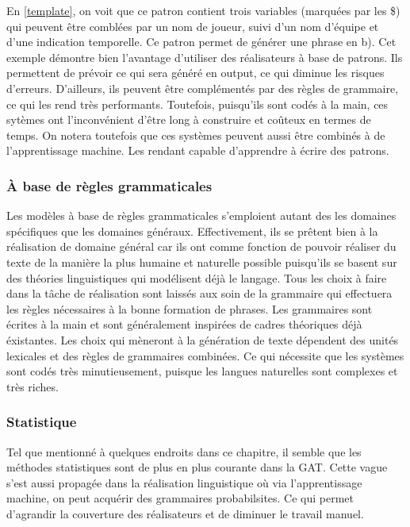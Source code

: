 En \ref{template}, on voit que ce patron contient trois variables (marquées par les \$) qui peuvent être comblées par un nom de joueur, suivi d'un nom d'équipe et d'une indication temporelle. Ce patron permet de générer une phrase en b). Cet exemple démontre bien l'avantage d'utiliser des réalisateurs à base de patrons. Ils permettent de prévoir ce qui sera généré en output, ce qui diminue les risques d'erreurs. D'ailleurs, ils peuvent être complémentés par des règles de grammaire, ce qui les rend très performants. Toutefois, puisqu'ils sont codés à la main, ces sytèmes ont l'inconvénient d'être long à construire et coûteux en termes de temps. On notera toutefois que ces systèmes peuvent aussi être combinés à de l'apprentissage machine. Les rendant capable d'apprendre à écrire des patrons.

\subsubsection{À base de règles grammaticales}
Les modèles à base de règles grammaticales s'emploient autant des les domaines spécifiques que les domaines généraux. Effectivement, ils se prêtent bien à la réalisation de domaine général car ils ont comme fonction de pouvoir réaliser du texte de la manière la plus humaine et naturelle possible puisqu'ils se basent sur des théories linguistiques qui modélisent déjà le langage. Tous les choix à faire dans la tâche de réalisation sont laissés aux soin de la grammaire qui effectuera les règles nécessaires à la bonne formation de phrases. Les grammaires sont écrites à la main et sont généralement inspirées de cadres théoriques déjà éxistantes. Les choix qui mèneront à la génération de texte dépendent des unités lexicales et des règles de grammaires combinées. Ce qui nécessite que les systèmes sont codés très minutieusement, puisque les langues naturelles sont complexes et très riches.

\subsubsection{Statistique}

Tel que mentionné à quelques endroits dans ce chapitre, il semble que les méthodes statistiques sont de plus en plus courante dans la \ac{GAT}. Cette vague s'est aussi propagée dans la réalisation linguistique où via l'apprentissage machine, on peut acquérir des grammaires probabilsites. Ce qui permet d'agrandir la couverture des réalisateurs et de diminuer le travail manuel.

